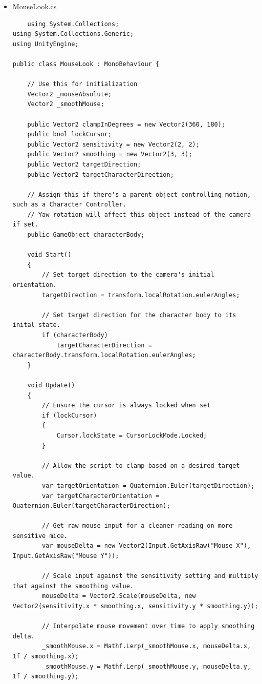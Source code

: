 \documentclass[12pt,a4paper]{article}
\begin{document}
\begin{itemize}
\begin{verbatim}
	\end{verbatim}
	\item MouseLook.cs
	\begin{verbatim}
	using System.Collections;
using System.Collections.Generic;
using UnityEngine;

public class MouseLook : MonoBehaviour {

    // Use this for initialization
    Vector2 _mouseAbsolute;
    Vector2 _smoothMouse;

    public Vector2 clampInDegrees = new Vector2(360, 180);
    public bool lockCursor;
    public Vector2 sensitivity = new Vector2(2, 2);
    public Vector2 smoothing = new Vector2(3, 3);
    public Vector2 targetDirection;
    public Vector2 targetCharacterDirection;

    // Assign this if there's a parent object controlling motion, such as a Character Controller.
    // Yaw rotation will affect this object instead of the camera if set.
    public GameObject characterBody;

    void Start()
    {
        // Set target direction to the camera's initial orientation.
        targetDirection = transform.localRotation.eulerAngles;

        // Set target direction for the character body to its inital state.
        if (characterBody)
            targetCharacterDirection = characterBody.transform.localRotation.eulerAngles;
    }

    void Update()
    {
        // Ensure the cursor is always locked when set
        if (lockCursor)
        {
            Cursor.lockState = CursorLockMode.Locked;
        }

        // Allow the script to clamp based on a desired target value.
        var targetOrientation = Quaternion.Euler(targetDirection);
        var targetCharacterOrientation = Quaternion.Euler(targetCharacterDirection);

        // Get raw mouse input for a cleaner reading on more sensitive mice.
        var mouseDelta = new Vector2(Input.GetAxisRaw("Mouse X"), Input.GetAxisRaw("Mouse Y"));

        // Scale input against the sensitivity setting and multiply that against the smoothing value.
        mouseDelta = Vector2.Scale(mouseDelta, new Vector2(sensitivity.x * smoothing.x, sensitivity.y * smoothing.y));

        // Interpolate mouse movement over time to apply smoothing delta.
        _smoothMouse.x = Mathf.Lerp(_smoothMouse.x, mouseDelta.x, 1f / smoothing.x);
        _smoothMouse.y = Mathf.Lerp(_smoothMouse.y, mouseDelta.y, 1f / smoothing.y);


\end{verbatim}
\end{itemize}
\end{document}
